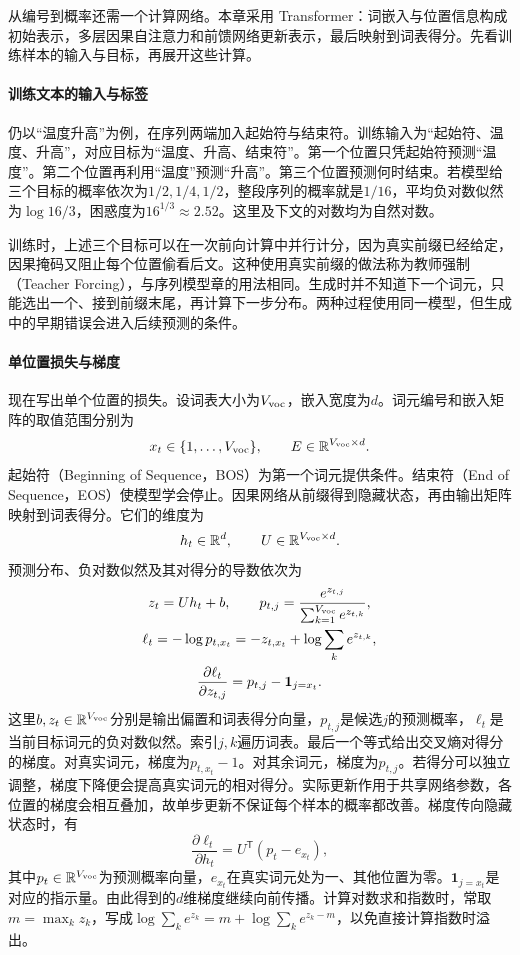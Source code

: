 从编号到概率还需一个计算网络。本章采用 Transformer：词嵌入与位置信息构成初始表示，多层因果自注意力和前馈网络更新表示，最后映射到词表得分\cite{vaswani2017attention}。先看训练样本的输入与目标，再展开这些计算。

\paragraph{训练文本的输入与标签}
仍以“温度升高”为例，在序列两端加入起始符与结束符。训练输入为“起始符、温度、升高”，对应目标为“温度、升高、结束符”。第一个位置只凭起始符预测“温度”。第二个位置再利用“温度”预测“升高”。第三个位置预测何时结束。若模型给三个目标的概率依次为$1/2,1/4,1/2$，整段序列的概率就是$1/16$，平均负对数似然为$\log16/3$，困惑度为$16^{1/3}\approx2.52$。这里及下文的对数均为自然对数。

训练时，上述三个目标可以在一次前向计算中并行计分，因为真实前缀已经给定，因果掩码又阻止每个位置偷看后文。这种使用真实前缀的做法称为教师强制（Teacher Forcing），与序列模型章的用法相同。生成时并不知道下一个词元，只能选出一个、接到前缀末尾，再计算下一步分布。两种过程使用同一模型，但生成中的早期错误会进入后续预测的条件。

\paragraph{单位置损失与梯度}
现在写出单个位置的损失。设词表大小为$V_{\rm voc}$，嵌入宽度为$d$。词元编号和嵌入矩阵的取值范围分别为
\[
 x_t\in\{1,\ldots,V_{\rm voc}\},\qquad
 E\in\mathbb{R}^{V_{\rm voc}\times d}.
\]
起始符（Beginning of Sequence，BOS）为第一个词元提供条件。结束符（End of Sequence，EOS）使模型学会停止。因果网络从前缀得到隐藏状态，再由输出矩阵映射到词表得分。它们的维度为
\[
 h_t\in\mathbb{R}^d,\qquad U\in\mathbb{R}^{V_{\rm voc}\times d}.
\]
预测分布、负对数似然及其对得分的导数依次为
\begin{gather}
 z_t=Uh_t+b,\qquad p_{t,j}=\frac{e^{z_{t,j}}}{\sum_{k=1}^{V_{\rm voc}}e^{z_{t,k}}},\\
 \ell_t=-\log p_{t,x_t}=-z_{t,x_t}+\log\sum_ke^{z_{t,k}},\\
 \frac{\partial\ell_t}{\partial z_{t,j}}=p_{t,j}-\mathbf1_{j=x_t}.
\end{gather}
这里$b,z_t\in\mathbb{R}^{V_{\rm voc}}$分别是输出偏置和词表得分向量，$p_{t,j}$是候选$j$的预测概率，$\ell_t$是当前目标词元的负对数似然。索引$j,k$遍历词表。最后一个等式给出交叉熵对得分的梯度。对真实词元，梯度为$p_{t,x_t}-1$。对其余词元，梯度为$p_{t,j}$。若得分可以独立调整，梯度下降便会提高真实词元的相对得分。实际更新作用于共享网络参数，各位置的梯度会相互叠加，故单步更新不保证每个样本的概率都改善。梯度传向隐藏状态时，有
\begin{equation}
 \frac{\partial\ell_t}{\partial h_t}=U^{\mathsf T}(p_t-e_{x_t}),
\end{equation}
其中$p_t\in\mathbb{R}^{V_{\rm voc}}$为预测概率向量，$e_{x_t}$在真实词元处为一、其他位置为零。$\mathbf1_{j=x_t}$是对应的指示量。由此得到的$d$维梯度继续向前传播。计算对数求和指数时，常取$m=\max_k z_k$，写成$\log\sum_ke^{z_k}=m+\log\sum_ke^{z_k-m}$，以免直接计算指数时溢出。

